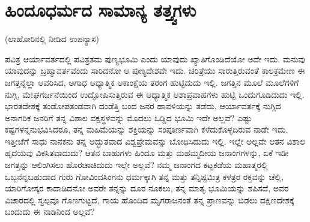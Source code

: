
\chapter{ಹಿಂದೂಧರ್ಮದ ಸಾಮಾನ್ಯ ತತ್ತ್ವಗಳು}

\begin{center}
(ಲಾಹೋರಿನಲ್ಲಿ ನೀಡಿದ ಉಪನ್ಯಾಸ)
\end{center}
  
ಪವಿತ್ರ ಆರ್ಯಾವರ್ತದಲ್ಲಿ ಪವಿತ್ರತಮ ಪುಣ್ಯಭೂಮಿ ಎಂದು ಯಾವುದು ಖ್ಯಾತಿಗೊಂಡಿದೆಯೋ ಅದೇ ಇದು. ಮನುವು ಯಾವುದನ್ನು ಬ್ರಹ್ಮಾವರ್ತವೆಂದು ಸಾರಿದನೋ ಆ ಪುಣ್ಯದೇಶವೇ ಇದು. ಚರಿತ್ರೆಯು ಸಾರುತ್ತಿರುವಂತೆ ಕಾಲಕ್ರಮೇಣ ಈ ಜಗತ್ತನ್ನೆಲ್ಲಾ ಆವರಿಸಿದ, ಅಗಾಧ ಆಧ್ಯಾತ್ಮಿಕ ಆಕಾಂಕ್ಷೆಯ ತರಂಗ ಹುಟ್ಟಿದುದು ಇಲ್ಲಿ. ಜಗತ್ತಿನ ಮೂಲೆ ಮೂಲೆಗಳಿಗೆ ನುಗ್ಗಿ, ಮೇಘಗರ್ಜನೆಯಿಂದ ಉದ್ಘೋಷಿಸುತ್ತಿರುವ ಈ ಆಧ್ಯಾತ್ಮಿಕ ಆಶಾಪ್ರವಾಹಗಳು ಹುಟ್ಟಿ ಒಂದುಗೂಡಿದುದು ಇಲ್ಲಿ. ಭಾರತದೇಶಕ್ಕೆ ತಂಡೋಪತಂಡವಾಗಿ ದಂಡೆತ್ತಿ ಬಂದ ಜನರ ಹಾವಳಿಯನ್ನು ತಡೆದು, ಆರ್ಯಾವರ್ತಕ್ಕೆ ನುಗ್ಗಿದ ಅನಾಗರಿಕ ಜನರಿಗೆ ತನ್ನ ವಿಶಾಲ ವಕ್ಷಸ್ಥಳವನ್ನು ಮೊದಲು ಒಡ್ಡಿದ ಭೂಮಿ ಇದೇ ಅಲ್ಲವೆ? ಎಷ್ಟು ಕಷ್ಟಗಳನ್ನನುಭವಿಸಿದರೂ, ತನ್ನ ಮಹಿಮೆಯನ್ನು ಶಕ್ತಿಯನ್ನು ಸಂಪೂರ್ಣವಾಗಿ ಕಳೆದುಕೊಳ್ಳದಿರುವ ನಾಡೇ ಇದು. ಇತ್ತೀಚೆಗೆ ಸಾಧು ನಾನಕನು ತನ್ನ ಅದ್ಭುತವಾದ ವಿಶ್ವಪ್ರೇಮವನ್ನು ಬೋಧಿಸಿದುದು ಇಲ್ಲಿ. ಇಲ್ಲೇ ಅಲ್ಲವೇ ಆತನ ವಿಶಾಲ ಹೃದಯವು ವಿಕಸಿತವಾದುದು? ಆತನ ಬಾಹುಗಳು ಹಿಂದೂ ಮತ್ತು ಮಹಮ್ಮದೀಯ ಜನಾಂಗಗಳನ್ನು, ಏಕೆ ಇಡೀ ಜಗತ್ತನ್ನು ಆಲಿಂಗಿಸಲು ಹೊರಚಾಚಿದುದು ಇಲ್ಲೇ ಅಲ್ಲವೆ? ನಮ್ಮ ಜನಾಂಗದ ಕಟ್ಟಕಡೆಯ ಮಹಾತ್ಮರಲ್ಲಿ ಒಬ್ಬನೆನ್ನಬಹುದಾದ ಗುರು ಗೋವಿಂದಸಿಂಗನು ಧರ್ಮಕ್ಕಾಗಿ ತನ್ನ ಮತ್ತು ತನ್ನಿಷ್ಟಮಿತ್ರ ಕಳತ್ರರ ರಕ್ತವನ್ನು ಚೆಲ್ಲಿ, ಯಾರಿಗೋಸ್ಕರ ಕಾದಾಡಿದನೋ ಅವರೇ ತನ್ನನ್ನು ದೂರ ನೂಕಲು, ತನ್ನ ಮಾತೃ ಭೂಮಿಯನ್ನು ಶಪಿಸದೆ, ಅವರ ವಿಚಾರದಲ್ಲಿ ಸ್ವಲ್ಪವೂ ಗೊಣಗುಟ್ಟದೆ, ಗಾಯ ಹೊಂದಿದ ಮೃಗರಾಜನಂತೆ ತನ್ನ ಪ್ರಾಣವನ್ನು ಬಿಡಲು ದಕ್ಷಿಣದೇಶಕ್ಕೆ ಬಂದುದು ಈ ನಾಡಿನಿಂದ ಅಲ್ಲವೆ?


